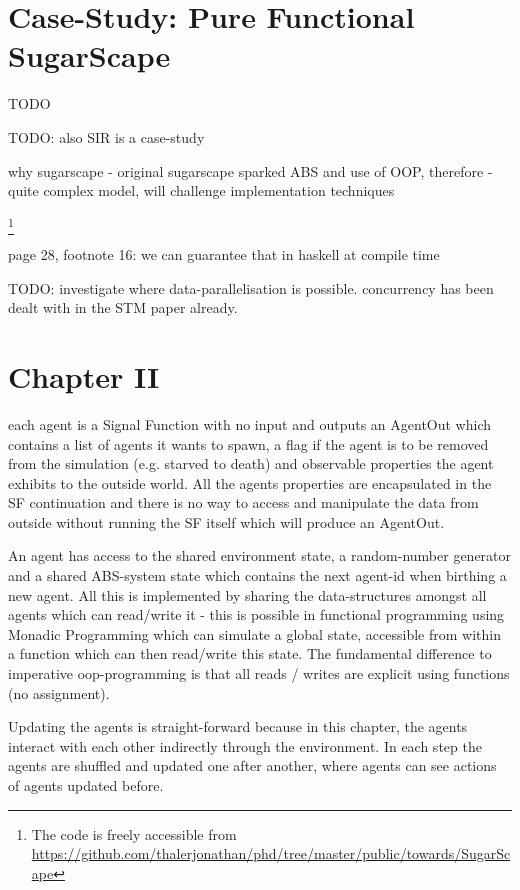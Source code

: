 \section{Case-Study: Pure Functional SugarScape}
TODO

TODO: also SIR is a case-study

why sugarscape
- original sugarscape sparked ABS and use of OOP, therefore 
- quite complex model, will challenge implementation techniques

\footnote{The code is freely accessible from \url{https://github.com/thalerjonathan/phd/tree/master/public/towards/SugarScape}}

\cite{weaver_replicating_nodate}

page 28, footnote 16: we can guarantee that in haskell at compile time

TODO: investigate where data-parallelisation is possible. concurrency has been dealt with in the STM paper already.

\section{Chapter II}
each agent is a Signal Function with no input and outputs an AgentOut which contains a list of agents it wants to spawn, a flag if the agent is to be removed from the simulation (e.g. starved to death) and observable properties the agent exhibits to the outside world. All the agents properties are encapsulated in the SF continuation and there is no way to access and manipulate the data from outside without running the SF itself which will produce an AgentOut.

An agent has access to the shared environment state, a random-number generator and a shared ABS-system state which contains the next agent-id when birthing a new agent. All this is implemented by sharing the data-structures amongst all agents which can read/write it - this is possible in functional programming using Monadic Programming which can simulate a global state, accessible from within a function which can then read/write this state. The fundamental difference to imperative oop-programming is that all reads / writes are explicit using functions (no assignment).

Updating the agents is straight-forward because in this chapter, the agents interact with each other indirectly through the environment. In each step the agents are shuffled and updated one after another, where agents can see actions of agents updated before. 


